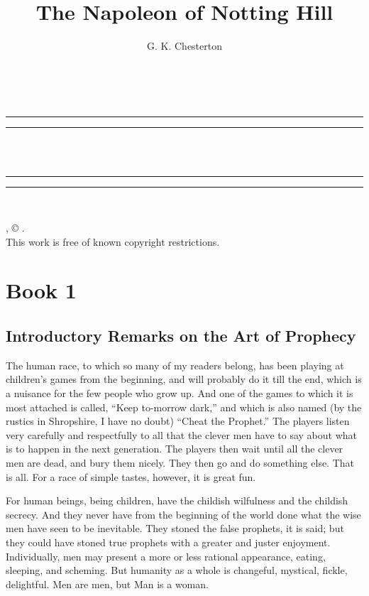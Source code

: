 \documentclass{book}
\date{}
\title{The Napoleon of Notting Hill}
\author{G. K. Chesterton}
\makeatletter
\renewcommand{\maketitle}{
  \thispagestyle{empty}
  \vspace*{\stretch{1}}
  
  \begin{center}
    {\Huge \@title   \\[5mm]}
  \end{center}
  \vspace*{\stretch{2}}
  
  \newpage
  \thispagestyle{empty}
  \cleardoublepage

  \begin{center}  
    \thispagestyle{empty}
    \vspace*{\baselineskip}
    \rule{\textwidth}{1.6pt}\vspace*{-\baselineskip}\vspace*{2pt}
    \rule{\textwidth}{0.4pt}\\[\baselineskip]
    
    {\Huge\scshape \@title   \\[5mm]}
    {\Large }
    
    \rule{\textwidth}{0.4pt}\vspace*{-\baselineskip}\vspace{3.2pt}
    \rule{\textwidth}{1.6pt}\\[\baselineskip]

    \vspace*{4\baselineskip}

    {\Large \@author}
    \vfill
    
  \end{center}
  
  \pagebreak
  \newpage
  \thispagestyle{empty}
  \null\vfill
  \noindent
  \begin{center}
    {\emph{\@title}, © \@author.\\[5mm]}
    {This work is free of known copyright restrictions.\\[5mm]}
  \end{center}
  \pagebreak
  \newpage
}
\makeatother
\begin{document}

\renewcommand{\partname}{Book}


\maketitle

\setcounter{tocdepth}{0}
\setcounter{secnumdepth}{0}
\setcounter{chapter}{0}\part*{Book 1}
\label{chapter-0}
\chapter{Introductory Remarks on the Art of Prophecy}
\label{chapter-1}
The human race, to which so many of my readers belong, has been playing at children’s games from the beginning, and will probably do it till the end, which is a nuisance for the few people who grow up. And one of the games to which it is most attached is called, “Keep to-morrow dark,” and which is also named (by the rustics in Shropshire, I have no doubt) “Cheat the Prophet.” The players listen very carefully and respectfully to all that the clever men have to say about what is to happen in the next generation. The players then wait until all the clever men are dead, and bury them nicely. They then go and do something else. That is all. For a race of simple tastes, however, it is great fun.

For human beings, being children, have the childish wilfulness and the childish secrecy. And they never have from the beginning of the world done what the wise men have seen to be inevitable. They stoned the false prophets, it is said; but they could have stoned true prophets with a greater and juster enjoyment. Individually, men may present a more or less rational appearance, eating, sleeping, and scheming. But humanity as a whole is changeful, mystical, fickle, delightful. Men are men, but Man is a woman.
\end{document}
